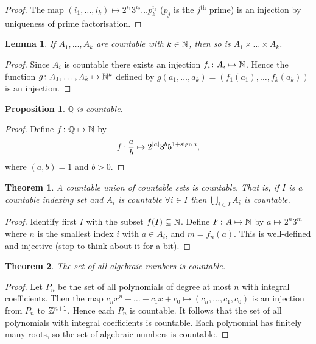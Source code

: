\documentclass{notes}
\theoremstyle{plain}
\newtheorem{theorem}{Theorem}[chapter]
\newtheorem{lemma}{Lemma}[chapter]
\newtheorem*{proposition}{Proposition}
\newcommand{\Q}{\mathbb{Q}}
\DeclareMathOperator{\sign}{sign}
\begin{document}
\begin{proof}
The map $(i_1, \dots, i_k) \mapsto 2^{i_1} 3^{i_2} \dots p_k^{i_k}$
($p_j$ is the $j^{\text{th}}$ prime) is an injection by uniqueness of prime
factorisation.
\end{proof}

\begin{lemma}
If $A_1, \dots, A_k$ are countable with $k \in \mathbb{N}$, then so is
$A_1 \times \dots \times A_k$.
\end{lemma}

\begin{proof}
Since $A_i$ is countable there exists an injection $f_i \colon A_i \mapsto \mathbb{N}$.
Hence the function $g \colon A_1, \dots, A_k \mapsto \mathbb{N}^k$ defined by
$g(a_1,\dots,a_k) = (f_1(a_1),\dots,f_k(a_k))$ is an injection.
\end{proof}

\begin{proposition}
$\Q$ is countable.
\end{proposition}

\begin{proof}
Define $f \colon \Q \mapsto \N$ by
\[
f \colon \frac{a}{b} \mapsto 2^{\abs{a}} 3^b 5^{1+\sign a},
\]
where $(a,b) = 1$ and $b > 0$.
\end{proof}

\begin{theorem}
A countable union of countable sets is countable.  That is, if $I$ is a
countable indexing set and $A_i$ is countable $\forall i \in I$ then
$\bigcup_{i \in I} A_i$ is countable.
\end{theorem}

\begin{proof}
Identify first $I$ with the subset $f(I) \subseteq \mathbb{N}$.
Define $F \colon A \mapsto \mathbb{N}$ by $ a \mapsto 2^n 3^m$ where
$n$ is the smallest index $i$ with $a \in A_i$, and $m = f_n(a)$.  This
is well-defined and injective (stop to think about it for a bit).
\end{proof}

\begin{theorem}
The set of all algebraic numbers is countable.
\end{theorem}

\begin{proof}
Let $P_n$ be the set of all polynomials of degree at most $n$ with integral
coefficients.  Then the map $c_n x^n + \dots + c_1 x + c_0
\mapsto (c_n, \dots, c_1, c_0)$ is an injection from $P_n$ to $\mathbb{Z}^{n+1}$.
Hence each $P_n$ is countable.  It follows that the set of all polynomials
with integral coefficients is countable.  Each polynomial has finitely
many roots, so the set of algebraic numbers is countable.
\end{proof}
\end{document}
